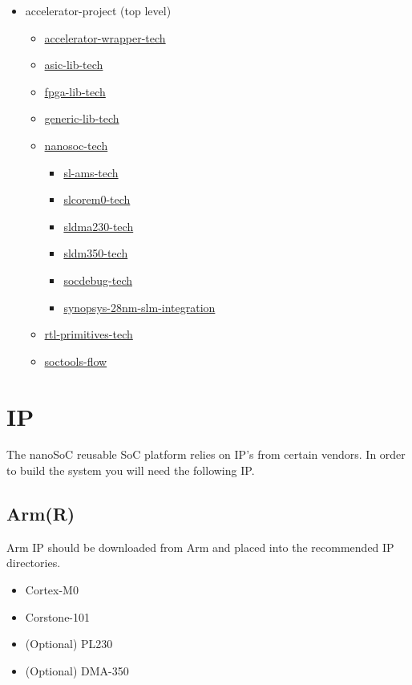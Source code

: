 \documentclass{report}
\begin{document}
\begin{itemize}
    \item accelerator-project (top level)
    \begin{itemize}
        \item \href{https://git.soton.ac.uk/soclabs/accelerator_wrapper_tech}{accelerator-wrapper-tech}
        \item \href{https://git.soton.ac.uk/soclabs/asic_library_tech}{asic-lib-tech}
        \item \href{https://git.soton.ac.uk/soclabs/fpga_lib_tech}{fpga-lib-tech}
        \item \href{https://git.soton.ac.uk/soclabs/generic_lib_tech}{generic-lib-tech}
        \item \href{https://git.soton.ac.uk/soclabs/nanosoc_tech}{nanosoc-tech}
        \begin{itemize} 
            \item \href{https://git.soton.ac.uk/soclabs/sl_ams_tech}{sl-ams-tech}
            \item \href{https://git.soton.ac.uk/soclabs/slcorem0_tech}{slcorem0-tech}
            \item \href{https://git.soton.ac.uk/soclabs/sldma230_tech}{sldma230-tech}
            \item \href{https://git.soton.ac.uk/soclabs/sldma350_tech}{sldm350-tech}
            \item \href{https://git.soton.ac.uk/soclabs/socdebug_tech}{socdebug-tech}
            \item \href{https://git.soton.ac.uk/soclabs/synopsys_28nm_slm_integration}{synopsys-28nm-slm-integration}
        \end{itemize}
        \item \href{https://git.soton.ac.uk/soclabs/rtl_primitives_tech}{rtl-primitives-tech}
        \item \href{https://git.soton.ac.uk/soclabs/soctools_flow}{soctools-flow}
    \end{itemize}
\end{itemize}


\section{IP}
The nanoSoC reusable SoC platform relies on IP's from certain vendors. In order to build the system you will need the following IP.
\subsection{Arm(R)}
Arm IP should be downloaded from Arm and placed into the recommended IP directories.
\begin{itemize}
    \item Cortex-M0
    \item Corstone-101
    \item (Optional) PL230
    \item (Optional) DMA-350
\end{itemize}
\end{document}

